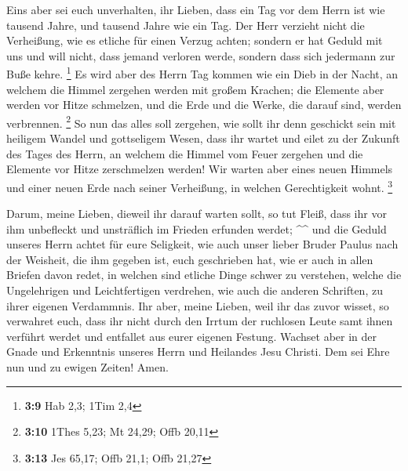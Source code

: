  Eins aber sei euch unverhalten, ihr Lieben, dass ein Tag
vor dem Herrn ist wie tausend Jahre, und tausend Jahre wie ein Tag.
 Der Herr verzieht nicht die Verheißung, wie es etliche
für einen Verzug achten; sondern er hat Geduld mit uns und will nicht,
dass jemand verloren werde, sondern dass sich jedermann zur Buße kehre.
\footnote{\textbf{3:9} Hab 2,3; 1Tim 2,4}  Es wird aber
des Herrn Tag kommen wie ein Dieb in der Nacht, an welchem die Himmel
zergehen werden mit großem Krachen; die Elemente aber werden vor Hitze
schmelzen, und die Erde und die Werke, die darauf sind, werden
verbrennen. \footnote{\textbf{3:10} 1Thes 5,23; Mt 24,29; Offb 20,11}
 So nun das alles soll zergehen, wie sollt ihr denn
geschickt sein mit heiligem Wandel und gottseligem Wesen,
 dass ihr wartet und eilet zu der Zukunft des Tages des
Herrn, an welchem die Himmel vom Feuer zergehen und die Elemente vor
Hitze zerschmelzen werden!  Wir warten aber eines neuen
Himmels und einer neuen Erde nach seiner Verheißung, in welchen
Gerechtigkeit wohnt. \footnote{\textbf{3:13} Jes 65,17; Offb 21,1; Offb
  21,27}

 Darum, meine Lieben, dieweil ihr darauf warten sollt, so
tut Fleiß, dass ihr vor ihm unbefleckt und unsträflich im Frieden
erfunden werdet; \^{}\^{}  und die Geduld unseres Herrn
achtet für eure Seligkeit, wie auch unser lieber Bruder Paulus nach der
Weisheit, die ihm gegeben ist, euch geschrieben hat,  wie
er auch in allen Briefen davon redet, in welchen sind etliche Dinge
schwer zu verstehen, welche die Ungelehrigen und Leichtfertigen
verdrehen, wie auch die anderen Schriften, zu ihrer eigenen Verdammnis.
 Ihr aber, meine Lieben, weil ihr das zuvor wisset, so
verwahret euch, dass ihr nicht durch den Irrtum der ruchlosen Leute samt
ihnen verführt werdet und entfallet aus eurer eigenen Festung.
 Wachset aber in der Gnade und Erkenntnis unseres Herrn
und Heilandes Jesu Christi. Dem sei Ehre nun und zu ewigen Zeiten! Amen.
